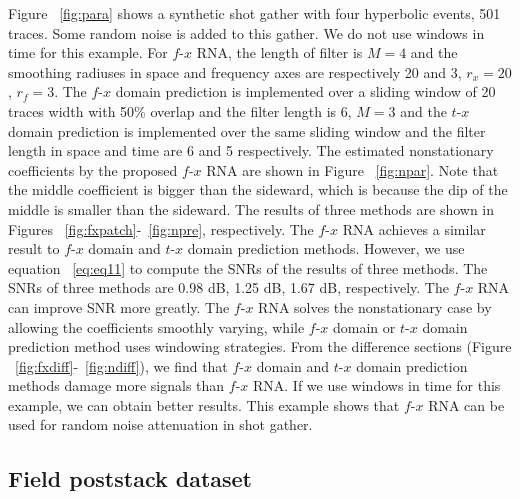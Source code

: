 

Figure ~\ref{fig:para} shows a synthetic shot gather with four hyperbolic events, 
501 traces. Some random noise is added to this gather. We do not use windows in time 
for this example. For $f$-$x$ RNA, the length of filter is $M=4$ and the smoothing radiuses in 
space and frequency axes are respectively 20 and 3, ${{r}_{x}}=20$, ${{r}_{f}}=3$. The $f$-$x$ domain prediction 
is implemented over a sliding window of 20 traces width with 50\% overlap and the filter length is 6, $M=3$ and 
the $t$-$x$ domain prediction is implemented over the same sliding window and the filter length in space and 
time are 6 and 5 respectively. The estimated nonstationary coefficients by the proposed $f$-$x$ RNA are shown 
in Figure ~\ref{fig:npar}. Note that the middle coefficient is bigger than the sideward, which is because the dip of 
the middle is smaller than the sideward. The results of three methods are shown in Figures ~\ref{fig:fxpatch}-~\ref{fig:npre}, 
respectively. The $f$-$x$ RNA achieves a similar result to $f$-$x$ domain and $t$-$x$ domain prediction methods. 
However, we use equation ~\ref{eq:eq11} to compute the SNRs of the results of three methods. The SNRs of three 
methods are 0.98 dB, 1.25 dB, 1.67 dB, respectively. The $f$-$x$ RNA can improve SNR more greatly. The 
$f$-$x$ RNA solves the nonstationary case by allowing the coefficients smoothly varying, while $f$-$x$ domain 
or $t$-$x$ domain prediction method uses windowing strategies. From the difference sections (Figure ~\ref{fig:fxdiff}-~\ref{fig:ndiff}), we 
find that $f$-$x$ domain and $t$-$x$ domain prediction methods damage more signals than $f$-$x$ RNA. If we use 
windows in time for this example, we can obtain better results. This example shows that $f$-$x$ RNA can 
be used for random noise attenuation in shot gather. 

\subsection{Field poststack dataset}

